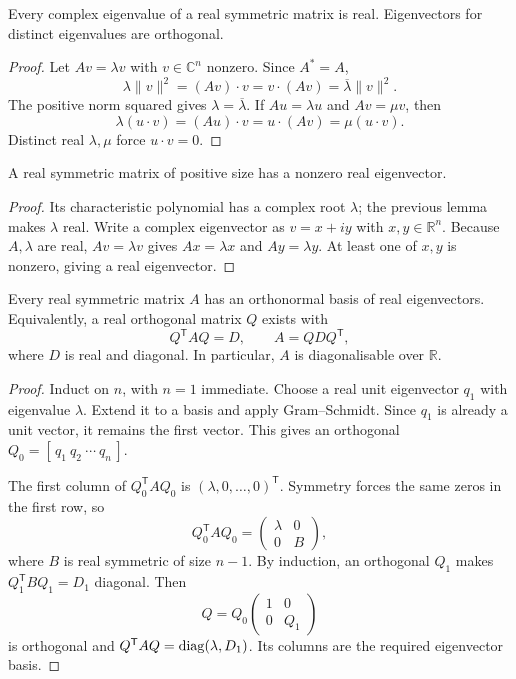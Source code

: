 \begin{lemma}
Every complex eigenvalue of a real symmetric matrix is real.
Eigenvectors for distinct eigenvalues are orthogonal.
\end{lemma}
\begin{proof}
Let $Av=\lambda v$ with $v\in\mathbb C^n$ nonzero. Since $A^*=A$,
\[
 \lambda\|v\|^2=(Av)\cdot v
 =v\cdot(Av)=\overline\lambda\|v\|^2.
\]
The positive norm squared gives $\lambda=\overline\lambda$.
If $Au=\lambda u$ and $Av=\mu v$, then
\[
 \lambda(u\cdot v)=(Au)\cdot v=u\cdot(Av)=\mu(u\cdot v).
\]
Distinct real $\lambda,\mu$ force $u\cdot v=0$.
\end{proof}

\begin{lemma}
A real symmetric matrix of positive size has a nonzero real eigenvector.
\end{lemma}
\begin{proof}
Its characteristic polynomial has a complex root $\lambda$; the
previous lemma makes $\lambda$ real.
Write a complex eigenvector as $v=x+iy$ with $x,y\in\mathbb R^n$.
Because $A,\lambda$ are real, $Av=\lambda v$ gives
$Ax=\lambda x$ and $Ay=\lambda y$.
At least one of $x,y$ is nonzero, giving a real eigenvector.
\end{proof}

\begin{theorem}
Every real symmetric matrix $A$ has an orthonormal basis of real
eigenvectors. Equivalently, a real orthogonal matrix $Q$ exists with
\[
 \boxed{Q^{\mathsf T}AQ=D,\qquad A=QDQ^{\mathsf T},}
\]
where $D$ is real and diagonal. In particular, $A$ is diagonalisable
over $\mathbb R$.
\end{theorem}
\begin{proof}
Induct on $n$, with $n=1$ immediate.
Choose a real unit eigenvector $q_1$ with eigenvalue $\lambda$.
Extend it to a basis and apply Gram--Schmidt.
Since $q_1$ is already a unit vector, it remains the first vector.
This gives an orthogonal $Q_0=[\,q_1\ q_2\ \cdots\ q_n\,]$.

The first column of $Q_0^{\mathsf T}AQ_0$ is
$(\lambda,0,\ldots,0)^{\mathsf T}$.
Symmetry forces the same zeros in the first row, so
\[
 Q_0^{\mathsf T}AQ_0=\begin{pmatrix}\lambda&0\\0&B\end{pmatrix},
\]
where $B$ is real symmetric of size $n-1$.
By induction, an orthogonal $Q_1$ makes $Q_1^{\mathsf T}BQ_1=D_1$ diagonal.
Then
\[
 Q=Q_0\begin{pmatrix}1&0\\0&Q_1\end{pmatrix}
\]
is orthogonal and $Q^{\mathsf T}AQ=\operatorname{diag}(\lambda,D_1)$.
Its columns are the required eigenvector basis.
\end{proof}

